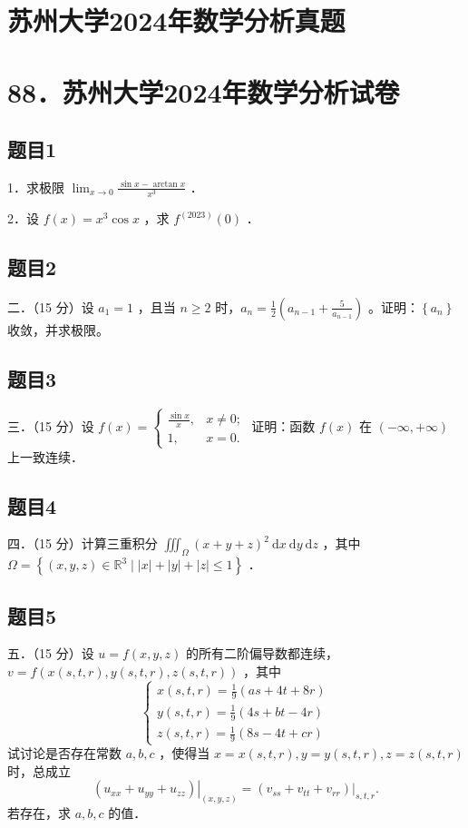 \documentclass{article}
\begin{document}
\section*{苏州大学2024年数学分析真题}
\section*{88．苏州大学2024年数学分析试卷}

\subsection{题目1}
1．求极限 \(\lim _{x \rightarrow 0} \frac{\sin x-\arctan x}{x^{3}}\) ．

2．设 \(f(x)=x^{3} \cos x\) ，求 \(f^{(2023)}(0)\) ．

\subsection{题目2}
二．（15 分）设 \(a_{1}=1\) ，且当 \(n \geq 2\) 时，\(a_{n}=\frac{1}{2}\left(a_{n-1}+\frac{5}{a_{n-1}}\right)\) 。证明：\(\left\{a_{n}\right\}\) 收敛，并求极限。

\subsection{题目3}
三．（15 分）设 \(f(x)=\left\{\begin{array}{ll}\frac{\sin x}{x}, & x \neq 0 ; \\ 1, & x=0 .\end{array}\right.\) 证明：函数 \(f(x)\) 在 \((-\infty,+\infty)\) 上一致连续．

\subsection{题目4}
四．（15 分）计算三重积分 \(\iiint_{\Omega}(x+y+z)^{2} \mathrm{~d} x \mathrm{~d} y \mathrm{~d} z\) ，其中 \(\Omega=\left\{(x,y,z)\in\mathbb{R}^{3}\mid |x|+|y|+|z|\leq1\right\}\) ．

\subsection{题目5}
五．（15 分）设 \(u=f(x, y, z)\) 的所有二阶偏导数都连续，\(v=f(x(s, t, r), y(s, t, r), z(s, t, r))\) ，其中
\[
\left\{\begin{array}{l}
x(s, t, r)=\frac{1}{9}(a s+4 t+8 r) \\
y(s, t, r)=\frac{1}{9}(4 s+b t-4 r) \\
z(s, t, r)=\frac{1}{9}(8 s-4 t+c r)
\end{array}\right.
\]
试讨论是否存在常数 \(a, b, c\) ，使得当 \(x=x(s, t, r), y=y(s, t, r), z=z(s, t, r)\) 时，总成立
\[
\left.\left(u_{x x}+u_{y y}+u_{z z}\right)\right|_{(x, y, z)}=\left.\left(v_{s s}+v_{t t}+v_{r r}\right)\right|_{s, t, r} .
\]
若存在，求 \(a, b, c\) 的值．
\end{document}

